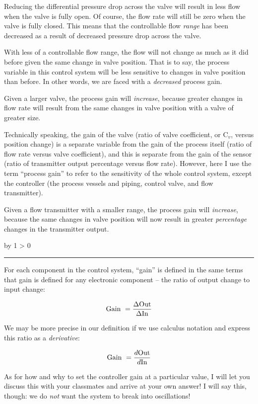 \documentclass[12pt,a4paper]{article}
\def\svar{
           \advance\answnum by 1
           \ifnum \answnum > 0
                \hrule
                \vskip 3pt
                \leftline{Svar \the\answnum}
                \vskip 3pt \fi}
\begin{document}
Reducing the differential pressure drop across the valve will result in less flow when the valve is fully open.  Of course, the flow rate will still be zero when the valve is fully closed.  This means that the controllable flow {\it range} has been decreased as a result of decreased pressure drop across the valve.

With less of a controllable flow range, the flow will not change as much as it did before given the same change in valve position.  That is to say, the process variable in this control system will be less sensitive to changes in valve position than before.  In other words, we are faced with a {\it decreased} process gain.

\vskip 10pt

Given a larger valve, the process gain will {\it increase}, because greater changes in flow rate will result from the same changes in valve position with a valve of greater size.

Technically speaking, the gain of the valve (ratio of valve coefficient, or C$_{v}$, versus position change) is a separate variable from the gain of the process itself (ratio of flow rate versus valve coefficient), and this is separate from the gain of the sensor (ratio of transmitter output percentage versus flow rate).  However, here I use the term ``process gain'' to refer to the sensitivity of the whole control system, except the controller (the process vessels and piping, control valve, and flow transmitter).

\vskip 10pt

Given a flow transmitter with a smaller range, the process gain will {\it increase}, because the same changes in valve position will now result in greater {\it percentage} changes in the transmitter output.

\vskip 10pt \filbreak 
\svar{} 

For each component in the control system, ``gain'' is defined in the same terms that gain is defined for any electronic component -- the ratio of output change to input change:

$$\hbox{Gain } = {\Delta \hbox{Out} \over \Delta \hbox{In}}$$

We may be more precise in our definition if we use calculus notation and express this ratio as a {\it derivative}:

$$\hbox{Gain } = {d \hbox{Out} \over d \hbox{In}}$$

As for how and why to set the controller gain at a particular value, I will let you discuss this with your classmates and arrive at your own answer!  I will say this, though: we do {\it not} want the system to break into oscillations!
\end{document}
